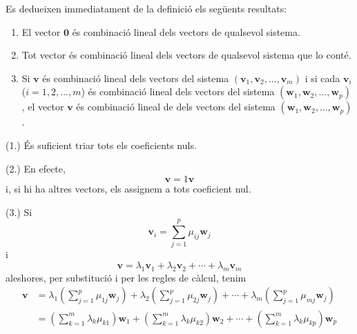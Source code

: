 \begin{teorema}
Es dedueixen immediatament de la definició els següents resultats:

\begin{enumerate}
\item El vector $\mathbf{0}$ és combinació lineal dels vectors de
qualsevol sistema.

\item Tot vector és combinació lineal dels vectors de qualsevol
sistema que lo conté.

\item Si $\mathbf{v}$ és combinació lineal dels vectors del sistema $%
(\mathbf{v}_{1},\mathbf{v}_{2},...,\mathbf{v}_{m})$ i si cada $\mathbf{v}%
_{i} $ ($i=1,2,...,m$) és combinació lineal dels vectors del sistema 
$(\mathbf{w}_{1},\mathbf{w}_{2},...,\mathbf{w}_{p})$, el vector $\mathbf{v}$
és combinació lineal de dels vectors del sistema $(\mathbf{w}_{1},%
\mathbf{w}_{2},...,\mathbf{w}_{p})$.
\end{enumerate}

\end{teorema}
\begin{prova}
(1.) És suficient triar tots els coeficients nuls.

(2.) En efecte,%
\begin{equation*}
\mathbf{v}=1\mathbf{v}
\end{equation*}%
i, si hi ha altres vectors, els assignem a tots coeficient nul.

(3.) Si%
\begin{equation*}
\mathbf{v}_{i}=\sum_{j=1}^{p}\mu _{ij}\mathbf{w}_{j}
\end{equation*}%
i%
\begin{equation*}
\mathbf{v}=\lambda _{1}\mathbf{v}_{1}+\lambda _{2}\mathbf{v}_{2}+\cdots
+\lambda _{m}\mathbf{v}_{m}
\end{equation*}%
aleshores, per substitució i per les regles de càlcul, tenim%
\begin{align*}
\mathbf{v} &=\lambda _{1}\left( \sum_{j=1}^{p}\mu _{1j}\mathbf{w}%
_{j}\right) +\lambda _{2}\left( \sum_{j=1}^{p}\mu _{2j}\mathbf{w}_{j}\right)
+\cdots +\lambda _{m}\left( \sum_{j=1}^{p}\mu _{mj}\mathbf{w}_{j}\right) \\
&=\left( \sum_{k=1}^{m}\lambda _{k}\mu _{k1}\right) \mathbf{w}_{1}+\left(
\sum_{k=1}^{m}\lambda _{k}\mu _{k2}\right) \mathbf{w}_{2}+\cdots +\left(
\sum_{k=1}^{m}\lambda _{k}\mu _{kp}\right) \mathbf{w}_{p}
\end{align*}
\end{prova}

